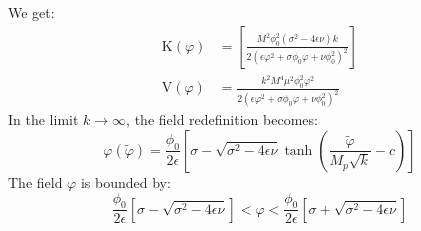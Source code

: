 \documentclass[aps,prd,reprint,preprintnumbers,showpacs,floatfix,nofootinbib,superscript address]{revtex4-2}
\begin{document}
We get:
\begin{align}
    \text{K}(\varphi) &= \left[\frac{M^2 \phi_0^2 (\sigma^2 - 4\epsilon\nu)k}{2 (\epsilon \varphi^2 + \sigma\phi_0\varphi + \nu \phi_0^2)^2}\right] \label{C4}  \\
    \text{V}(\varphi) &= \frac{ k^2 M^4 \mu^2 \phi^2_0 \varphi^2}{2(\epsilon \varphi^2 + \sigma\phi_0\varphi + \nu \phi_0^2)^2}
\end{align}
In the limit $k \rightarrow\infty$, the field redefinition becomes:
\begin{equation}
    \varphi(\tilde{\varphi}) = \frac{\phi_0}{2\epsilon} \left[\sigma - \sqrt{\sigma^2 - 4\epsilon \nu} \tanh\left(\frac{\tilde{\varphi}}{M_p\sqrt{k}}-c \right) \right]
\end{equation}
The field $\varphi$ is bounded by:
\begin{equation}
    \frac{\phi_0}{2\epsilon} \left[\sigma - \sqrt{\sigma^2 - 4\epsilon \nu}\right] < \varphi < \frac{\phi_0}{2\epsilon} \left[\sigma + \sqrt{\sigma^2 - 4\epsilon \nu}  \right]
\end{equation}

\newpage
\,
\newpage
\printbibliography
\end{document}
